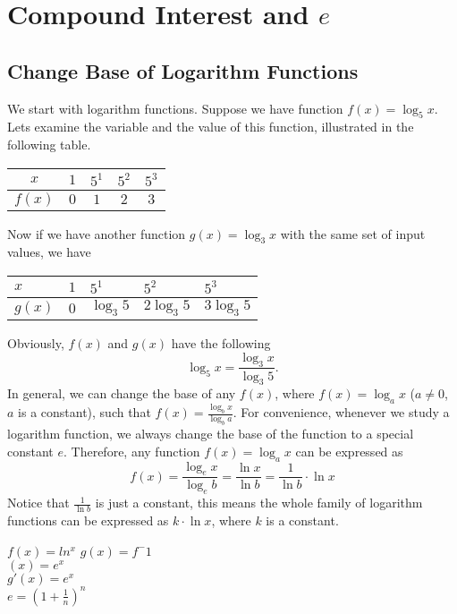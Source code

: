 \documentclass[11pt, oneside]{article}   	%
\begin{document}
\section{Compound Interest and $e$}
\subsection{Change Base of Logarithm Functions}
We start with logarithm functions. Suppose we have function $f(x)=\log_5x$. Lets examine the variable and the value of this function, illustrated in the following table.

\renewcommand{\arraystretch}{2}
\begin{center}
\begin{tabular}{|c|c|c|c|c|}
\hline
$x$ & $1$ & $5^1$ & $5^2$ & $5^3$\\
\hline
$f(x)$ & $0$ & $1$ & $2$ & $3$\\
\hline
\end{tabular}
\end{center}

Now if we have another function $g(x)=\log_3x$ with the same set of input values, we have

\renewcommand{\arraystretch}{2}
\begin{center}
\begin{tabular}{|>{\centering}p{1cm}|>{\centering}p{1cm}|>{\centering}p{1cm}|>{\centering}p{1cm}|>{\centering\arraybackslash}p{1cm}|}
\hline
$x$ & $1$ & $5^1$ & $5^2$ & $5^3$\\
\hline
$g(x)$ & $0$ & $\log_3 5$ & $2\log_3 5$ & $3 \log_3 5$\\
\hline
\end{tabular}
\end{center}
Obviously, $f(x)$ and $g(x)$ have the following
\[\log_5 x = \frac{\log_3 x}{\log_3 5} .\]
In general, we can change the base of any $f(x)$, where $f(x) = \log_a x$ ($a \ne 0$, $a$ is a constant), such that 
$f(x)=\frac{\log_b x}{\log_b a}$. 
For convenience, whenever we study a logarithm function, we always change the base of the function to a special constant  $e$. Therefore, any function $f(x)=\log_a x$ can be expressed as \[f(x)=\frac{\log_e x}{\log_e b}= \frac{\ln x}{\ln b}= \frac {1}{\ln b}\cdot \ln x\]
Notice that $\frac{1}{\ln b}$ is just a constant, this means the whole family of logarithm functions can be expressed as $k \cdot \ln x$, where $k$ is a constant.

$f(x)=ln^x$
$g(x)=f^-1$\\
$(x)=e^x$\\
$g'(x)=e^x$\\
$e=(1+\frac{1}{n})^n$
\end{document}
